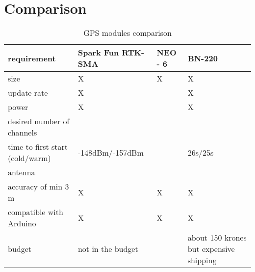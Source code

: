 \section{Comparison}
\begin{center}
    \begin{table}[h!]
    \begin{tabularx}{0.8\textwidth}{
    | >{\centering\arraybackslash}X 
    | >{\centering\arraybackslash}X 
    | >{\centering\arraybackslash}X  
    | >{\centering\arraybackslash}X | }

    \hline
    requirement&Spark Fun RTK-SMA&NEO - 6&BN-220 \\
    \hline
    size&X&X&X\\
    \hline
    update rate&X&&X\\
    \hline
    power&X&&X\\
    \hline
    desired number of channels&&&72\\
    \hline
    time to first start (cold/warm)&-148dBm/-157dBm&&26s/25s\\
    \hline
    antenna&&&\\
    \hline
    accuracy of min 3 m&X&X&X\\
    \hline
    compatible with Arduino&X&X&X\\
    \hline
    budget&not in the budget&&about 150 krones but expensive shipping\\
    \hline
\end{tabularx}
 \caption{GPS modules comparison }
        \label{tab:Gps modules}
\end{table}
\end{center}







